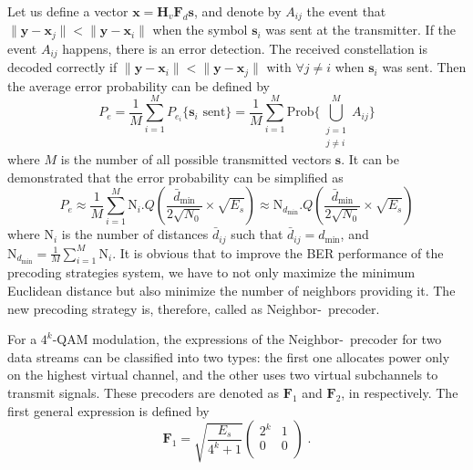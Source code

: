 Let us define a vector $\mathbf{x}= \mathbf{H}_v\mathbf{F}_d\mathbf{s}$, and denote by $A_{ij}$ the event that $\|\mathbf{y}-\mathbf{x}_j\| < \|\mathbf{y}-\mathbf{x}_i\|$ when the symbol $\mathbf{s}_i$ was sent at the transmitter. If the event $A_{ij}$ happens, there is an error detection. The received constellation is decoded correctly if $\|\mathbf{y}-\mathbf{x}_i\| < \|\mathbf{y}-\mathbf{x}_j\|$ with $\forall j \neq i$ when $\mathbf{s}_i$ was sent. Then the average error probability can be defined by
\begin{equation}
P_e = \frac{1}{M} \sum_{i=1}^{M} P_{e_i} \{\text{$\mathbf{s}_i$ sent}\} = \frac{1}{M} \sum_{i=1}^{M} \text{Prob}\{\bigcup_{\substack{j=1 \\ j \neq i}}^{M} A_{ij}\} 
\end{equation}
where $M$ is the number of all possible transmitted vectors $\mathbf{s}$. It can be demonstrated that the error probability can be simplified as 
\begin{equation}
\label{eq:ab5_approx_prob}
P_e  \approx  \frac{1}{M} \sum_{i=1}^{M} \text{N}_i . Q \left( \frac{\bar{d}_{\min}}{2 \sqrt{N_0}} \times \sqrt{E_s} \right) \approx  \text{N}_{d_{\min}} . Q \left( \frac{\bar{d}_{\min}}{2 \sqrt{N_0}} \times \sqrt{E_s} \right) 
\end{equation}
where $\text{N}_i$ is the number of distances $\bar{d}_{ij}$ such that $\bar{d}_{ij} = d_{\min}$, and $\text{N}_{d_{\min}} = \frac{1}{M} \sum_{i=1}^{M} \text{N}_i$. It is obvious that to improve the BER performance of the precoding strategies system, we  have to not only maximize the minimum Euclidean distance but also minimize the number of neighbors providing it. The new precoding strategy is, therefore, called as Neighbor-\dmin\ precoder. 

For a $4^k$-QAM modulation, the expressions of the Neighbor-\dmin\ precoder for two data streams can be classified into two types: the first one allocates power only on the highest virtual channel, and the other uses two virtual subchannels to transmit signals. These precoders are denoted as $\mathbf{F}_1$ and $\mathbf{F}_2$, in respectively. The first general expression is defined by
\begin{equation}
\label{eq:ab5_F1}
\mathbf{F}_{1}=\sqrt{\frac{E_s}{4^k+1}}
		\begin{pmatrix}
			2^k & 1  \\
			0 &  0 \\
		\end{pmatrix} \;.			
\end{equation} 

